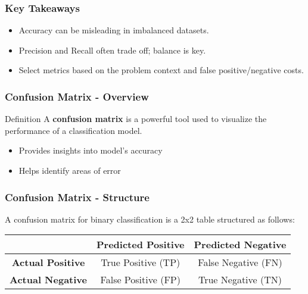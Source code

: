 \documentclass{beamer}
\begin{document}
\begin{frame}[fragile]
    \frametitle{Key Takeaways}
    \begin{itemize}
        \item Accuracy can be misleading in imbalanced datasets.
        \item Precision and Recall often trade off; balance is key.
        \item Select metrics based on the problem context and false positive/negative costs.
    \end{itemize}
\end{frame}

\begin{frame}[fragile]
    \frametitle{Confusion Matrix - Overview}
    \begin{block}{Definition}
    A \textbf{confusion matrix} is a powerful tool used to visualize the performance of a classification model.
    \end{block}
    
    \begin{itemize}
        \item Provides insights into model's accuracy
        \item Helps identify areas of error
    \end{itemize}
\end{frame}

\begin{frame}[fragile]
    \frametitle{Confusion Matrix - Structure}
    A confusion matrix for binary classification is a 2x2 table structured as follows:
    
    \begin{center}
    \begin{tabular}{|c|c|c|}
      \hline
                   & \textbf{Predicted Positive} & \textbf{Predicted Negative} \\
      \hline
      \textbf{Actual Positive} & True Positive (TP)     & False Negative (FN)     \\
      \hline
      \textbf{Actual Negative} & False Positive (FP)    & True Negative (TN)      \\
      \hline
    \end{tabular}
    \end{center}
\end{frame}
\end{document}
